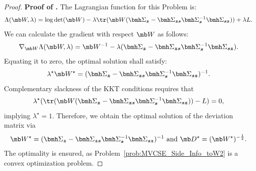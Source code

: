 \documentclass[opre, blindrev]{informs4}
\newcommand{\1}[1]{\mathds{1}{\left(#1\right)}}
\begin{document}
\begin{appendices}
\begin{proof}{\bf Proof of .}
The Lagrangian function for this Problem is:
$$
\Lambda(\mb W, \lambda) = \log\det(\mb W) - \lambda \tr(\mb W (\bmh \Sigma_{\bm z} - \bmh \Sigma_{\bm z \bm s} \bmh \Sigma_{\bm s}^{-1} \bmh \Sigma_{\bm s \bm z})) + \lambda L.
$$
We can calculate the gradient with respect $\mb W$ as follows:
$$
\nabla_{\mb W} \Lambda(\mb W, \lambda) = \mb W^{-1} - \lambda (\bmh \Sigma_{\bm z} - \bmh \Sigma_{\bm z \bm s} \bmh \Sigma_{\bm s}^{-1} \bmh \Sigma_{\bm s \bm z}).
$$
Equating it to zero, the optimal solution shall satisfy:
$$
\lambda^\star \mb W^\star = (\bmh \Sigma_{\bm z} - \bmh \Sigma_{\bm z \bm s} \bmh \Sigma_{\bm s}^{-1} \bmh \Sigma_{\bm s \bm z} )^{-1}.
$$
Complementary slackness of the KKT conditions requires that
$$
\lambda^\star (\tr(\mb W ( \bmh \Sigma_{\bm z} - \bmh \Sigma_{\bm z \bm s} \bmh \Sigma_{\bm s}^{-1} \bmh \Sigma_{\bm s \bm z})) - L) = 0,
$$
implying $\lambda^\star = 1$. Therefore, we obtain the optimal solution of the deviation matrix via
$$
\mb W^\star = (\bmh \Sigma_{\bm z} - \bmh \Sigma_{\bm z \bm s} \bmh \Sigma_{\bm s}^{-1} \bmh \Sigma_{\bm s \bm z})^{-1} ~\text{and}~ \mb D^\star = (\mb W^\star)^{-\frac{1}{2}}.
$$
The optimality is ensured, as Problem~\eqref{prob:MVCSE_Side_Info_toW2} is a convex optimization problem.
\hfill \Halmos
\end{proof}
\vspace{3mm}


\end{appendices}
\end{document}
